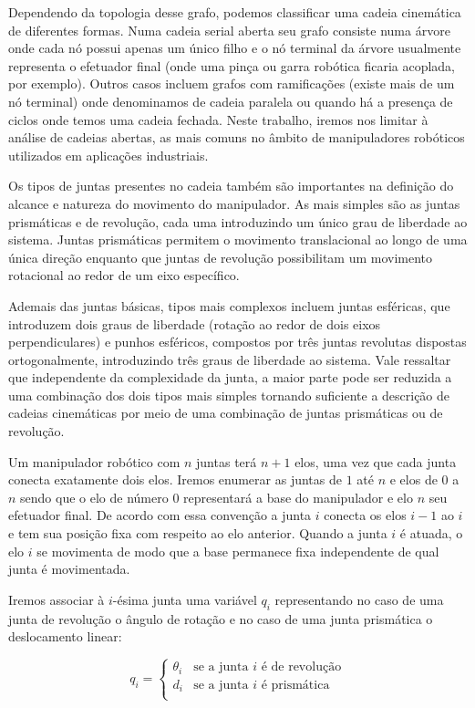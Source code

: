Dependendo da topologia desse grafo, podemos classificar uma cadeia cinemática
de diferentes formas. Numa cadeia serial aberta seu grafo consiste numa árvore
onde cada nó possui apenas um único filho e o nó terminal da árvore usualmente
representa o efetuador final (onde uma pinça ou garra robótica ficaria
acoplada, por exemplo). Outros casos incluem grafos com ramificações (existe
mais de um nó terminal) onde denominamos de cadeia paralela ou quando há a
presença de ciclos onde temos uma cadeia fechada. Neste trabalho, iremos nos
limitar à análise de cadeias abertas, as mais comuns no âmbito de manipuladores
robóticos utilizados em aplicações industriais.

Os tipos de juntas presentes no cadeia também são importantes na definição do
alcance e natureza do movimento do manipulador. As mais simples são as juntas
prismáticas e de revolução, cada uma introduzindo um único grau de liberdade ao
sistema. Juntas prismáticas permitem o movimento translacional ao longo de uma
única direção enquanto que juntas de revolução possibilitam um movimento
rotacional ao redor de um eixo específico.

Ademais das juntas básicas, tipos mais complexos incluem juntas esféricas, que
introduzem dois graus de liberdade (rotação ao redor de dois eixos
perpendiculares) e punhos esféricos, compostos por três juntas revolutas
dispostas ortogonalmente, introduzindo três graus de liberdade ao sistema. Vale
ressaltar que independente da complexidade da junta, a maior parte pode ser
reduzida a uma combinação dos dois tipos mais simples tornando suficiente a
descrição de cadeias cinemáticas por meio de uma combinação de juntas
prismáticas ou de revolução.

Um manipulador robótico com $n$ juntas terá $n + 1$ elos, uma vez que cada
junta conecta exatamente dois elos. Iremos enumerar as juntas de $1$ até $n$ e
elos de $0$ a $n$ sendo que o elo de número $0$ representará a base do
manipulador e elo $n$ seu efetuador final. De acordo com essa convenção a junta
$i$ conecta os elos $i - 1$ ao $i$ e tem sua posição fixa com respeito ao elo
anterior. Quando a junta $i$ é atuada, o elo $i$ se movimenta de modo que a
base permanece fixa independente de qual junta é movimentada.

Iremos associar à $i$-ésima junta uma variável $q_i$ representando no caso de
uma junta de revolução o ângulo de rotação e no caso de uma junta prismática o
deslocamento linear:

\begin{equation}
    q_i =
    \begin{cases}
        \theta_i & \text{se a junta $i$ é de revolução} \\
        d_i      & \text{se a junta $i$ é prismática}   \\
    \end{cases}
\end{equation}

